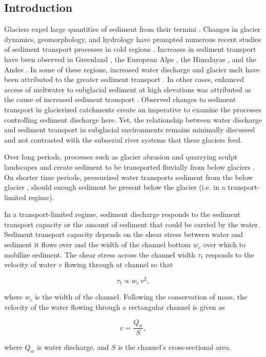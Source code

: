 \documentclass[11pt]{article}
\begin{document}
\begin{spacing}{1}
  \section{Introduction}

  Glaciers expel large quantities of sediment from their termini \citep{hallet1996}.
  Changes in glacier dynamics, geomorphology, and hydrology  have prompted numerous  recent studies of  sediment transport processes in cold regions \citep[e.g.][]{zhang2022}.
  Increases in sediment transport  have been observed in Greenland \citep{bendixen2017}, the European Alps \citep{costa2017}, the Himalayas \citep{li2021}, and the Andes \citep{vergara2022}.
  In some of these regions, increased water discharge and glacier melt have been attributed to the greater sediment transport \citep{bendixen2017,costa2017,li2021}.
  In other cases, enhanced access of meltwater to subglacial sediment at high elevations was attributed as the cause of increased sediment transport \citep{delaney2020,vergara2022}.
  Observed changes to sediment transport in glacierized catchments create an imperative to examine the processes controlling sediment discharge here. 
  Yet, the relationship between water discharge and sediment transport in subglacial environments remains minimally discussed and not contrasted with the subaerial river systems that these glaciers feed.
 
  Over long periods, processes such as glacier abrasion and quarrying sculpt landscapes and create sediment to be transported fluvially from below glaciers \citep[c.f.][]{hallet1979,iverson2012,ugelvig2018}. 
  On shorter time periods, pressurized water transports sediment from the below glacier \citep{walder1994,creyts2013,beaud2018}, should enough sediment be present below the glacier (i.e. in a transport-limited regime).
  
  In a transport-limited regime, sediment discharge responds to the sediment transport capacity or the amount of sediment that could be carried by the water. Sediment transport capacity depends on the shear stress between water and sediment it flows  over \citep{shields1936,meyer1948,engelund1967} and the width of the channel bottom $w_c$ over which to mobilize sediment. The shear stress  across the channel width $\tau_t$ responds to the velocity of water $v$ flowing through at channel so that 
  \begin{linenomath*}
    \begin{equation}
      \label{eq:tau_t}
      \tau_t \propto w_c\, v^2,
    \end{equation}
  \end{linenomath*}
  where $w_c$ is the width of the channel.
  Following the conservation of mass, the velocity of the water flowing through a rectangular channel is given as 
  \begin{linenomath*}
    \begin{equation}
      \label{eq:v}
      v = \frac{Q_w}{S},
    \end{equation}
  \end{linenomath*}
  where $Q_w$ is water discharge,  and $S$ is the channel's cross-sectional area.


\end{spacing}
\end{document}
